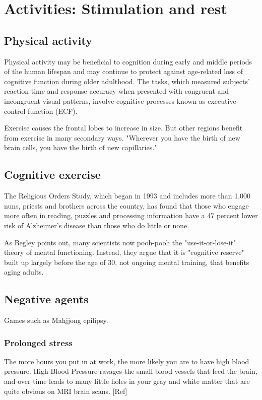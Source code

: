 \documentclass[oneside, article]{memoir}
\begin{document}
\section{Activities: Stimulation and rest}
\subsection{Physical activity}
Physical activity may be beneficial to cognition during early and middle periods of the human lifespan and may continue to protect against age-related loss of cognitive function during older adulthood. The tasks, which measured subjects' reaction time and response accuracy when presented with congruent and incongruent visual patterns, involve cognitive processes known as executive control function (ECF).

Exercise causes the frontal lobes to increase in size. But other regions benefit from exercise in many secondary ways. "Wherever you have the birth of new brain cells, you have the birth of new capillaries."

\subsection{Cognitive exercise}
The Religious Orders Study, which began in 1993 and includes more than 1,000 nuns, priests and brothers across the country, has found that those who engage more often in reading, puzzles and processing information have a 47 percent lower risk of Alzheimer's disease than those who do little or none.

As Begley points out, many scientists now pooh-pooh the "use-it-or-lose-it" theory of mental functioning. Instead, they argue that it is "cognitive reserve" built up largely before the age of 30, not ongoing mental training, that benefits aging adults.

\subsection{Negative agents}
Games such as Mahjjong epilipsy.

\subsubsection{Prolonged stress}
The more hours you put in at work, the more likely you are to have high blood pressure. High Blood Pressure ravages the small blood vessels that feed the brain, and over time leads to many little holes in your gray and white matter that are quite obvious on MRI brain scans. [Ref]
\end{document}

